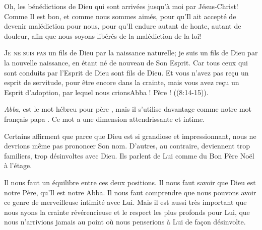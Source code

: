 
Oh, les bénédictions de Dieu qui sont arrivées jusqu'à moi
 par Jésus-Christ! Comme Il est bon, et comme nous sommes aimés,
 pour qu'Il ait accepté de devenir malédiction pour nous,
 pour qu'Il endure autant de honte, autant de douleur,
 afin que nous soyons libérés de la malédiction de la loi!

\dvrule







\lettrine{J}{e ne suis pas} un fils de Dieu par la naissance naturelle;
 je suis un fils de Dieu par la nouvelle naissance, en étant né de nouveau
 de Son Esprit.
 \Og Car tous ceux qui sont conduits par l'Esprit de Dieu sont fils de Dieu.
 Et vous n'avez pas re\c{c}u un esprit de servitude, pour être encore
 dans la crainte, mais vous avez re\c{c}u un Esprit d'adoption, par lequel
 nous crions\frcolon \Og Abba ! Père ! \Fg{} ((8:14-15)).

\emph{Abba}, est le mot hébreu pour \Og père \Fg{},
 mais il s'utilise davantage comme notre mot fran\c{c}ais \Og papa \Fg{}.
 Ce mot a une dimension attendrissante et intime.


Certains affirment que parce que Dieu est si grandiose et impressionnant,
 nous ne devrions même pas prononcer Son nom. D'autres, au contraire,
 deviennent trop familiers, trop désinvoltes avec Dieu.
 Ils parlent de Lui comme du \Og Bon Père Noël à l'étage. \Fg{}

Il nous faut un équilibre entre ces deux positions.
 Il nous faut savoir que Dieu est notre Père, qu'Il est notre Abba.
 Il nous faut comprendre que nous pouvons avoir ce genre de merveilleuse
 intimité avec Lui. Mais il est aussi très important que nous ayons
 la crainte révérencieuse et le respect les plus profonds pour Lui,
 que nous n'arrivions jamais au point où nous penserions à Lui
 de fa\c{c}on désinvolte.

